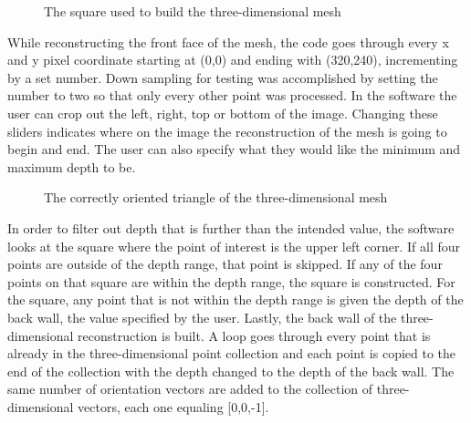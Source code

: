 \documentclass[pdftex,10.5pt]{report}
\begin{document}
\begin{figure}[H]
\centering
	\caption{The square used to build the three-dimensional mesh}
		\label{square}
\end{figure}

While reconstructing the front face of the mesh, the code goes through every x and y pixel coordinate starting at (0,0) and ending with (320,240), incrementing by a set number. Down sampling for testing was accomplished by setting the number to two so that only every other point was processed. In the software the user can crop out the left, right, top or bottom of the image. Changing these sliders indicates where on the image the reconstruction of the mesh is going to begin and end. The user can also specify what they would like the minimum and maximum depth to be. 

\begin{figure}[H]
\centering
	\caption{The correctly oriented triangle of the three-dimensional mesh}
	\label{triangle}
\end{figure}

In order to filter out depth that is further than the intended value, the software looks at the square where the point of interest is the upper left corner.  If all four points are outside of the depth range, that point is skipped. If any of the four points on that square are within the depth range, the square is constructed. For the square, any point that is not within the depth range is given the depth of the back wall, the value specified by the user. Lastly, the back wall of the three-dimensional reconstruction is built. A loop goes through every point that is already in the three-dimensional point collection and each point is copied to the end of the collection with the depth changed to the depth of the back wall. The same number of orientation vectors are added to the collection of three-dimensional vectors, each one equaling [0,0,-1]. 
\cite{cite8}
\end{document}
